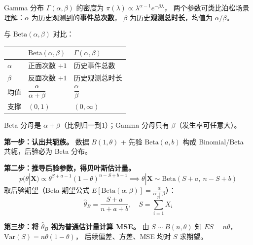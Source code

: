 \begin{note}
Gamma 分布 $\Gamma(\alpha,\beta)$ 的密度为 $\pi(\lambda)\propto\lambda^{\alpha-1}e^{-\beta\lambda}$，
两个参数可类比泊松场景理解：$\alpha$ 为历史观测到的\textbf{事件总次数}，
$\beta$ 为历史\textbf{观测总时长}，均值为 $\alpha/\beta$。

与 $\mathrm{Beta}(\alpha,\beta)$ 对比：

\begin{table}[h]
\centering
\renewcommand{\arraystretch}{1.5}
\begin{tabular}{lll}
\toprule
& $\mathrm{Beta}(\alpha,\beta)$ & $\Gamma(\alpha,\beta)$ \\
\midrule
$\alpha$ & 正面次数 $+1$ & 历史事件总数 \\
$\beta$  & 反面次数 $+1$ & 历史观测总时长 \\
均值     & $\dfrac{\alpha}{\alpha+\beta}$ & $\dfrac{\alpha}{\beta}$ \\
支撑     & $(0,1)$ & $(0,\infty)$ \\
\bottomrule
\end{tabular}
\end{table}

Beta 分母是 $\alpha+\beta$（比例归一到1）；Gamma 分母只有 $\beta$（发生率可任意大）。
\end{note}
\begin{solution}
\textbf{第一步：认出共轭族。}
数据 $B(1,\theta)$ + 先验 $\text{Beta}(a,b)$ 构成 Binomial/Beta 共轭，后验必为 Beta 分布。

\textbf{第二步：推导后验参数，得贝叶斯估计量。}
\[
p(\theta|\boldsymbol{X}) \propto \theta^{S+a-1}(1-\theta)^{n-S+b-1}
\implies \theta|\boldsymbol{X} \sim \text{Beta}(S+a,\ n-S+b)
\]
取后验期望（Beta 期望公式 $E[\text{Beta}(\alpha,\beta)]=\frac{\alpha}{\alpha+\beta}$）：
\[
\hat{\theta}_B = \frac{S+a}{n+a+b}, \quad S = \sum_{i=1}^n X_i
\]

\textbf{第三步：将 $\hat{\theta}_B$ 视为普通估计量计算 MSE。}
由 $S \sim B(n,\theta)$ 知 $ES = n\theta$，$\text{Var}(S) = n\theta(1-\theta)$，
后续偏差、方差、MSE 均对 $S$ 求期望。
\end{solution}
